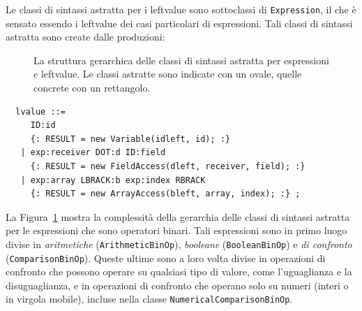 Le classi di sintassi astratta per i leftvalue sono sottoclassi di
\texttt{Expression}, il che \`e sensato essendo i leftvalue dei casi
particolari di espressioni. Tali classi di sintassi astratta
sono create dalle produzioni:
%
\begin{figure}[t]
\begin{center}
\end{center}
\caption{La struttura gerarchica delle classi di sintassi astratta per
         espressioni e leftvalue. Le classi astratte sono indicate con un
         ovale, quelle concrete con un rettangolo.}
  \label{fig:expressions_hierarchy}
\end{figure}
%
\begin{verbatim}
  lvalue ::=
     ID:id
     {: RESULT = new Variable(idleft, id); :}
   | exp:receiver DOT:d ID:field
     {: RESULT = new FieldAccess(dleft, receiver, field); :}
   | exp:array LBRACK:b exp:index RBRACK
     {: RESULT = new ArrayAccess(bleft, array, index); :} ;
\end{verbatim}

La Figura~\ref{fig:expressions_hierarchy} mostra la complessit\`a della
gerarchia delle classi di sintassi astratta per le
espressioni che sono operatori binari. Tali espressioni
sono in primo luogo divise
in \emph{aritmetiche} (\texttt{ArithmeticBinOp}),
\emph{booleane} (\texttt{BooleanBinOp}) e
\emph{di confronto} (\texttt{ComparisonBinOp}).
Queste ultime sono a loro volta divise in operazioni di confronto
che possono operare su qualsiasi tipo di valore, come
l'uguaglianza e la disuguaglianza, e in operazioni di confronto
che operano solo su numeri (interi o in virgola mobile),
incluse nella classe \texttt{NumericalComparisonBinOp}.
%

